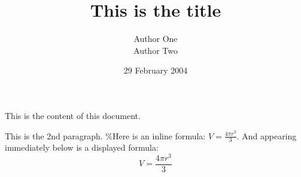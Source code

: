 \documentclass[12pt]{article}
\title{This is the title}
\author{Author One \\ Author Two}
\date{29 February 2004}
\begin{document}
\maketitle

This is the content of this document.%

This is the 2nd paragraph.
\%Here is an inline formula:
$   V = \frac{4 \pi r^3}{3}  $.
And appearing immediately below
is a displayed formula:
$$  V = \frac{4 \pi r^3}{3}  $$
\end{document}
